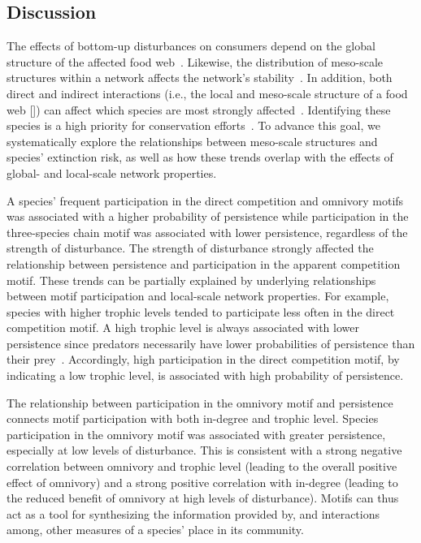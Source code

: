 \documentclass[12pt]{article}
\begin{document}
\begin{spacing}{2.0}
\section*{Discussion}

    The effects of bottom-up disturbances on consumers depend on the global structure of the affected food web~\citep{Dunne2002, Eklof2006, PascualDunne2006}.
    Likewise, the distribution of meso-scale structures within a network affects the network's stability~\citep{prill2005dynamic, bascompte2005simple}.
    In addition, both direct and indirect interactions (i.e., the local and meso-scale structure of a food web  [\citealp[]{Cirtwill2018FoodWebs}]) can affect which species are most strongly affected~\citep{curtsdotter2011robustness, dunne2009cascading, Eklof2006}. 
    Identifying these species is a high priority for conservation efforts~\citep{Bottrilletal2008}.
    To advance this goal, we systematically explore the relationships between meso-scale structures and species' extinction risk, as well as how these trends overlap with the effects of global- and local-scale network properties.

    
    A species' frequent participation in the direct competition and omnivory motifs was associated with a higher probability of persistence while participation in the three-species chain motif was associated with lower persistence, regardless of the strength of disturbance.
    The strength of disturbance strongly affected the relationship between persistence and participation in the apparent competition motif.
    These trends can be partially explained by underlying relationships between motif participation and local-scale network properties.
    For example, species with higher trophic levels tended to participate less often in the direct competition motif.
    A high trophic level is always associated with lower persistence since predators necessarily have lower probabilities of persistence than their prey~\citep{Eklof2013}.
    Accordingly, high participation in the direct competition motif, by indicating a low trophic level, is associated with high probability of persistence.
    
    
    The relationship between participation in the omnivory motif and persistence connects motif participation with both in-degree and trophic level.
    Species participation in the omnivory motif was associated with greater persistence, especially at low levels of disturbance.
    This is consistent with a strong negative correlation between omnivory and trophic level (leading to the overall positive effect of omnivory) and a strong positive correlation with in-degree (leading to the reduced benefit of omnivory at high levels of disturbance). 
    Motifs can thus act as a tool for synthesizing the information provided by, and interactions among, other measures of a species' place in its community.
    

\end{spacing}
\end{document}
